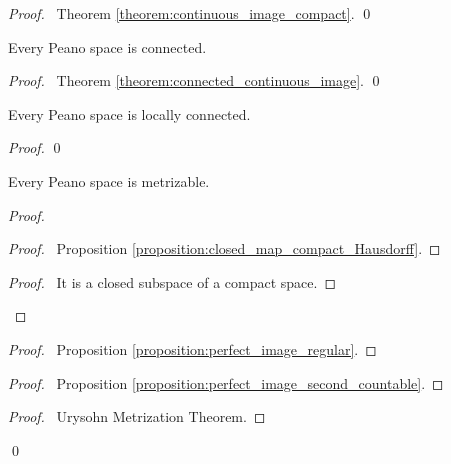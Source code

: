 \begin{proof}
    \pf\ Theorem \ref{theorem:continuous_image_compact}. \qed
\end{proof}

\begin{proposition}
    Every Peano space is connected.
\end{proposition}

\begin{proof}
    \pf\ Theorem \ref{theorem:connected_continuous_image}. \qed
\end{proof}

\begin{proposition}
    Every Peano space is locally connected.
\end{proposition}

\begin{proof}
    \pf
    \qed
\end{proof}

\begin{proposition}
    Every Peano space is metrizable.
\end{proposition}

\begin{theorem}
    \pf
    \begin{proof}
        \begin{proof}
            \pf\ Proposition \ref{proposition:closed_map_compact_Hausdorff}.
        \end{proof}
        \begin{proof}
            \pf\ It is a closed subspace of a compact space.
        \end{proof}
    \end{proof}
    \begin{proof}
        \pf\ Proposition \ref{proposition:perfect_image_regular}.
    \end{proof}
    \begin{proof}
        \pf\ Proposition \ref{proposition:perfect_image_second_countable}.
    \end{proof}
    \begin{proof}
        \pf\ Urysohn Metrization Theorem.
    \end{proof}
    \qed
\end{theorem}

